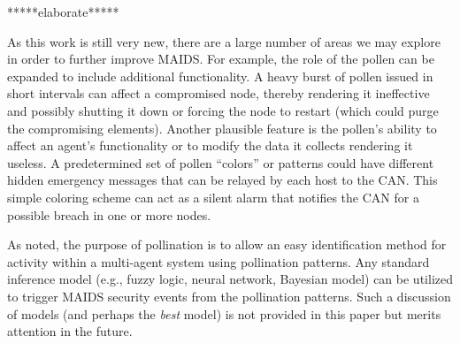 \documentclass{acm_proc_article-sp}
\begin{document}
*****elaborate*****

As this work is still very new, there are a large number of areas we may explore in order to further improve MAIDS.  For example, the role of the pollen can be expanded to include additional functionality.  A heavy burst of pollen issued in short intervals can affect a compromised node, thereby rendering it ineffective and possibly shutting it down or forcing the node to restart (which could purge the compromising elements).  Another plausible feature is the pollen's ability to affect an agent's functionality or to modify the data it collects rendering it useless.  A predetermined set of pollen ``colors'' or patterns could have different hidden emergency messages that can be relayed by each host to the CAN.  This simple coloring scheme can act as a silent alarm that notifies the CAN for a possible breach in one or more nodes.

As noted, the purpose of pollination is to allow an easy identification method for activity within a multi-agent system using pollination patterns.  Any standard inference model (e.g., fuzzy logic, neural network, Bayesian model) can be utilized to trigger MAIDS security events from the pollination patterns.  Such a discussion of models (and perhaps the {\it best} model) is not provided in this paper but merits attention in the future.

\nocite{*}


\balancecolumns
\end{document}

